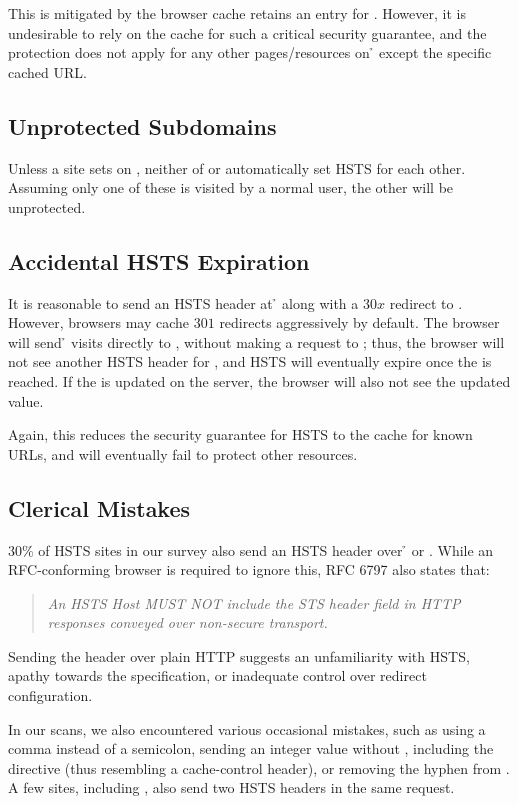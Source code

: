 \documentclass{acm_proc_article-sp}
\begin{document}
{This is mitigated by the browser cache retains an entry for \site{\genericsite}. However, it is undesirable to rely on the cache for such a critical security guarantee, and the protection does not apply for any other pages/resources on {\h} except the specific cached URL.

\subsection{Unprotected Subdomains}

Unless a site sets {\iSD} on {\s}, neither of {\s} or {\sw} automatically set HSTS for each other. Assuming only one of these is visited by a normal user, the other will be unprotected.

\subsection{Accidental HSTS Expiration}

It is reasonable to send an HSTS header at {\h} along with a $30x$ redirect to {\sw}. However, browsers may cache $301$ redirects  aggressively by default. The browser will send {\h} visits directly to {\sw}, without making a request to {\s}; thus, the browser will not see another HSTS header for {\s}, and HSTS will eventually expire once the {\ma} is reached. If the {\ma} is updated on the server, the browser will also not see the updated value.

Again, this reduces the security guarantee for HSTS to the cache for known URLs, and will eventually fail to protect other resources.

\subsection{Clerical Mistakes}

$30\%$ of HSTS sites in our survey also send an HSTS header over {\h} or {\hw}. While an RFC-conforming browser is required to ignore this, RFC 6797\cite{rfc} also states that:

\begin{quotation}\it
An HSTS Host MUST NOT include the STS header field in HTTP responses conveyed over non-secure transport.
\end{quotation}

Sending the header over plain HTTP suggests an unfamiliarity with HSTS, apathy towards the specification, or inadequate control over redirect configuration.

In our scans, we also encountered various occasional mistakes, such as using a comma instead of a semicolon, sending an integer value without , including the  directive (thus resembling a cache-control header), or removing the hyphen from . A few sites, including , also send two HSTS headers in the same request.

}
\end{document}
